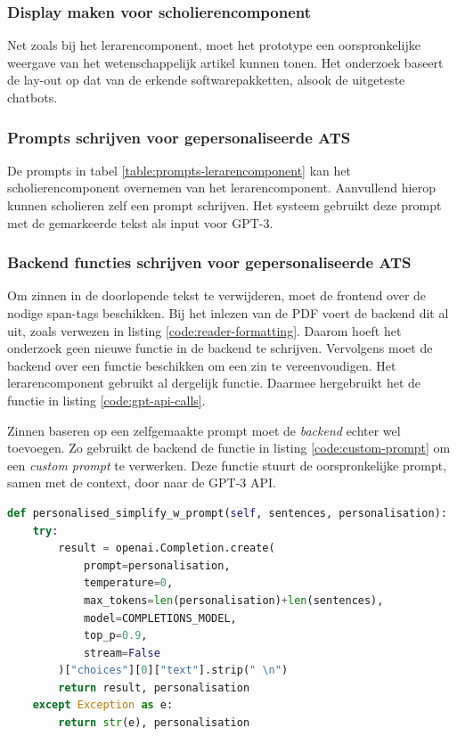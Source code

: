 \subsubsection{Display maken voor scholierencomponent}

Net zoals bij het lerarencomponent, moet het prototype een oorspronkelijke weergave van het wetenschappelijk artikel kunnen tonen. Het onderzoek baseert de lay-out op dat van de erkende softwarepakketten, alsook de uitgeteste chatbots. 

\subsubsection{Prompts schrijven voor gepersonaliseerde ATS}

De prompts in tabel \ref{table:prompts-lerarencomponent} kan het scholierencomponent overnemen van het lerarencomponent. Aanvullend hierop kunnen scholieren zelf een prompt schrijven. Het systeem gebruikt deze prompt met de gemarkeerde tekst als input voor GPT-3.

\subsubsection{Backend functies schrijven voor gepersonaliseerde ATS}

Om zinnen in de doorlopende tekst te verwijderen, moet de frontend over de nodige span-tags beschikken. Bij het inlezen van de PDF voert de backend dit al uit, zoals verwezen in listing \ref{code:reader-formatting}. Daarom hoeft het onderzoek geen nieuwe functie in de backend te schrijven. Vervolgens moet de backend over een functie beschikken om een zin te vereenvoudigen. Het lerarencomponent gebruikt al dergelijk functie. Daarmee hergebruikt het de functie in listing \ref{code:gpt-api-calls}. 

\medspace

Zinnen baseren op een zelfgemaakte prompt moet de \textit{backend} echter wel toevoegen. Zo gebruikt de backend de functie in listing \ref{code:custom-prompt} om een \textit{custom prompt} te verwerken. Deze functie stuurt de oorspronkelijke prompt, samen met de context, door naar de GPT-3 API.

\begin{lstlisting}[language=python, caption={Een API-call sturen naar GPT-3 met een custom prompt.}, label={code:custom-prompt}]
def personalised_simplify_w_prompt(self, sentences, personalisation):
	try:
		result = openai.Completion.create(
			prompt=personalisation,
			temperature=0,
			max_tokens=len(personalisation)+len(sentences),
			model=COMPLETIONS_MODEL,
			top_p=0.9,
			stream=False
		)["choices"][0]["text"].strip(" \n")
		return result, personalisation
	except Exception as e:
		return str(e), personalisation
\end{lstlisting}

